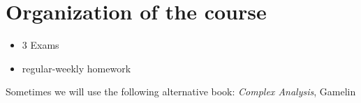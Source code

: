 \section{Organization of the course}
\begin{itemize}
	\item 3 Exams
	\item regular-weekly homework
\end{itemize}
Sometimes we will use the following alternative book: \emph{Complex Analysis}, Gamelin